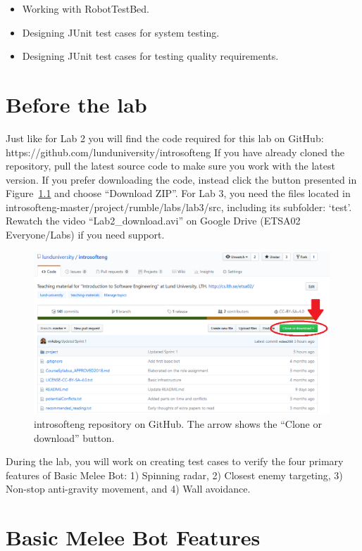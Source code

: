 \documentclass{scrreprt}
\begin{document}
\begin{itemize}
\item Working with RobotTestBed.
\item Designing JUnit test cases for system testing.
\item Designing JUnit test cases for testing quality requirements.
\end{itemize}

\chapter{Before the lab}
Just like for Lab 2 you will find the code required for this lab on GitHub:\\https://github.com/lunduniversity/introsofteng
If you have already cloned the repository, pull the latest source code to make sure you work with the latest version. If you prefer downloading the code, instead click the button presented in Figure~\ref{fig:github} and choose ``Download ZIP''. For Lab 3, you need the files located in introsofteng-master/project/rumble/labs/lab3/src, including its subfolder: `test'. Rewatch the video ``Lab2_download.avi'' on Google Drive (ETSA02 Everyone/Labs) if you need support.

\begin{figure}
\centering
\includegraphics[width=0.99\textwidth]{figures/GitHub.png}
\caption{introsofteng repository on GitHub. The arrow shows the ``Clone or download'' button.}
\label{fig:github}
\end{figure}


During the lab, you will work on creating test cases to verify the four primary features of Basic Melee Bot: 1) Spinning radar, 2) Closest enemy targeting, 3) Non-stop anti-gravity movement, and 4) Wall avoidance.

\chapter{Basic Melee Bot Features}
\end{document}
